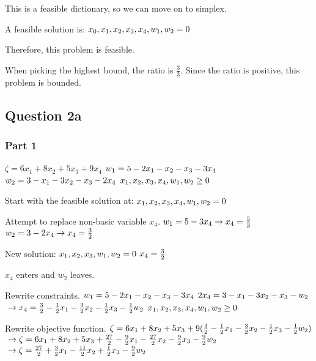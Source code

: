 \documentclass[17pt]{extarticle}
\begin{document}
This is a feasible dictionary, so we can move on to simplex.

A feasible solution is:
$\\ x_0, x_1, x_2, x_3, x_4, w_1, w_2 = 0$

Therefore, this problem is feasible.

When picking the highest bound, the ratio is $\frac{3}{3}$. Since the ratio is positive, this problem is bounded.

\newpage
\subsection*{Question 2a}
\subsubsection*{Part 1}
$\zeta = 6x_1 + 8x_2 + 5x_3 + 9x_4$
$\\ w_1 = 5 - 2x_1 - x_2 - x_3 - 3x_4$
$\\ w_2 = 3 - x_1 - 3x_2 - x_3 - 2x_4$
$\\ x_1, x_2, x_3, x_4, w_1, w_2 \geq 0$

\bigskip Start with the feasible solution at:
$\\x_1, x_2, x_3, x_4, w_1, w_2 = 0$

\bigskip Attempt to replace non-basic variable $x_4$.
$\\ w_1 = 5 - 3x_4 \to x_4 = \frac{5}{3}$
$\\ w_2 = 3 - 2x_4 \to x_4 = \frac{3}{2}$

\bigskip New solution:
$\\x_1, x_2, x_3, w_1, w_2 = 0$
$\\x_4 = \frac{3}{2}$

\bigskip $x_4$ enters and $w_2$ leaves.

\bigskip Rewrite constraints.
$\\ w_1 = 5 - 2x_1 - x_2 - x_3 - 3x_4$
$\\ 2x_4 = 3 - x_1 - 3x_2 - x_3 - w_2$
$\\\to x_4 = \frac{3}{2} - \frac{1}{2}x_1 - \frac{3}{2}x_2 - \frac{1}{2}x_3 - \frac{1}{2}w_2$
$\\ x_1, x_2, x_3, x_4, w_1, w_2 \geq 0$

\bigskip Rewrite objective function.
$\\\zeta = 6x_1 + 8x_2 + 5x_3 + 9(\frac{3}{2} - \frac{1}{2}x_1 - \frac{3}{2}x_2 - \frac{1}{2}x_3 - \frac{1}{2}w_2)$
$\\\to \zeta = 6x_1 + 8x_2 + 5x_3 + \frac{27}{2} - \frac{9}{2}x_1 - \frac{27}{2}x_2 - \frac{9}{2}x_3 - \frac{9}{2}w_2$
$\\\to \zeta = \frac{27}{2} + \frac{3}{2}x_1 - \frac{11}{2}x_2 + \frac{1}{2}x_3 - \frac{9}{2}w_2$
\end{document}
